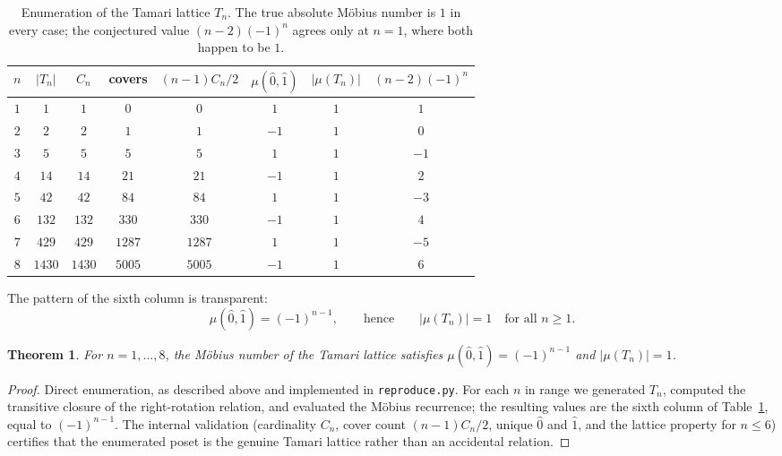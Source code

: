 \documentclass[11pt]{article}
\newtheorem{theorem}{Theorem}
\theoremstyle{definition}
\begin{document}
\begin{table}[ht]
\centering
\begin{tabular}{cccccccc}
\toprule
$n$ & $|T_n|$ & $C_n$ & covers & $(n-1)C_n/2$ & $\mu(\hat0,\hat1)$
& $|\mu(T_n)|$ & $(n-2)(-1)^n$ \\
\midrule
$1$ & $1$    & $1$    & $0$    & $0$    & $1$  & $1$ & $1$  \\
$2$ & $2$    & $2$    & $1$    & $1$    & $-1$ & $1$ & $0$  \\
$3$ & $5$    & $5$    & $5$    & $5$    & $1$  & $1$ & $-1$ \\
$4$ & $14$   & $14$   & $21$   & $21$   & $-1$ & $1$ & $2$  \\
$5$ & $42$   & $42$   & $84$   & $84$   & $1$  & $1$ & $-3$ \\
$6$ & $132$  & $132$  & $330$  & $330$  & $-1$ & $1$ & $4$  \\
$7$ & $429$  & $429$  & $1287$ & $1287$ & $1$  & $1$ & $-5$ \\
$8$ & $1430$ & $1430$ & $5005$ & $5005$ & $-1$ & $1$ & $6$  \\
\bottomrule
\end{tabular}
\caption{Enumeration of the Tamari lattice $T_n$. The true absolute
M\"obius number is $1$ in every case; the conjectured value
$(n-2)(-1)^n$ agrees only at $n=1$, where both happen to be $1$.}
\label{tab:enumerate}
\end{table}

The pattern of the sixth column is transparent:
\[
\mu(\hat0,\hat1)=(-1)^{n-1},
\qquad\text{hence}\qquad
|\mu(T_n)|=1 \quad\text{for all } n\ge 1 .
\]

\begin{theorem}\label{thm:value}
For $n=1,\dots,8$, the M\"obius number of the Tamari lattice satisfies
$\mu(\hat0,\hat1)=(-1)^{n-1}$ and $|\mu(T_n)|=1$.
\end{theorem}

\begin{proof}
Direct enumeration, as described above and implemented in
\texttt{reproduce.py}. For each $n$ in range we generated $T_n$, computed
the transitive closure of the right-rotation relation, and evaluated the
M\"obius recurrence; the resulting values are the sixth column of
Table~\ref{tab:enumerate}, equal to $(-1)^{n-1}$. The internal validation
(cardinality $C_n$, cover count $(n-1)C_n/2$, unique $\hat0$ and $\hat1$,
and the lattice property for $n\le 6$) certifies that the enumerated poset
is the genuine Tamari lattice rather than an accidental relation.
\end{proof}
\end{document}
